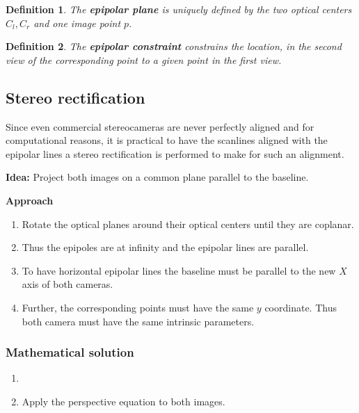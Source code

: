 \documentclass[10pt,a4paper]{scrartcl}
\newtheorem{define}{Definition}
\begin{document}
\begin{multicols*}{2}

\begin{define}
The \textbf{epipolar plane} is uniquely defined by the two optical centers $C_l,C_r$ and one image point $p$.
\end{define}

\begin{define}
The \textbf{epipolar constraint} constrains the location, in the second view of the corresponding point to a given point in the first view.
\end{define}


\subsection{Stereo rectification}

Since even commercial stereocameras are never perfectly aligned and for computational reasons, it is practical to have the scanlines aligned with the epipolar lines a stereo rectification is performed to make for such an alignment.

\vspace{3ex}

\textbf{Idea:} Project both images on a common plane parallel to the baseline.

\vspace{3ex}

\textbf{Approach}

\begin{enumerate}
\item Rotate the optical planes around their optical centers until they are coplanar.
\item Thus the epipoles are at infinity and the epipolar lines are parallel.
\item To have horizontal epipolar lines the baseline must be parallel to the new $X$ axis of both cameras.
\item Further, the corresponding points must have the same $y$ coordinate. Thus both camera must have the same intrinsic parameters.
\end{enumerate}

\subsubsection{Mathematical solution}

\begin{enumerate}
\item {}
\item Apply the perspective equation to both images.


\end{enumerate}
\end{multicols*}
\end{document}
